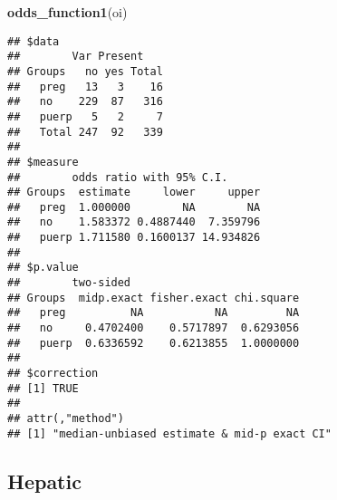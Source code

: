 \documentclass[
]{article}
\newenvironment{Shaded}{\begin{snugshade}}{\end{snugshade}}
\newcommand{\DataTypeTok}[1]{\textcolor[rgb]{0.13,0.29,0.53}{#1}}
\newcommand{\KeywordTok}[1]{\textcolor[rgb]{0.13,0.29,0.53}{\textbf{#1}}}
\newcommand{\NormalTok}[1]{#1}
\newcommand{\OperatorTok}[1]{\textcolor[rgb]{0.81,0.36,0.00}{\textbf{#1}}}
\newcommand{\OtherTok}[1]{\textcolor[rgb]{0.56,0.35,0.01}{#1}}
\newcommand{\StringTok}[1]{\textcolor[rgb]{0.31,0.60,0.02}{#1}}
\begin{document}
\begin{Shaded}
\begin{Highlighting}[]
\KeywordTok{odds_function1}\NormalTok{(oi)}
\end{Highlighting}
\end{Shaded}

\begin{verbatim}
## $data
##        Var Present
## Groups   no yes Total
##   preg   13   3    16
##   no    229  87   316
##   puerp   5   2     7
##   Total 247  92   339
## 
## $measure
##        odds ratio with 95% C.I.
## Groups  estimate     lower     upper
##   preg  1.000000        NA        NA
##   no    1.583372 0.4887440  7.359796
##   puerp 1.711580 0.1600137 14.934826
## 
## $p.value
##        two-sided
## Groups  midp.exact fisher.exact chi.square
##   preg          NA           NA         NA
##   no     0.4702400    0.5717897  0.6293056
##   puerp  0.6336592    0.6213855  1.0000000
## 
## $correction
## [1] TRUE
## 
## attr(,"method")
## [1] "median-unbiased estimate & mid-p exact CI"
\end{verbatim}

\hypertarget{hepatic}{%
\subsection{Hepatic}\label{hepatic}}

\begin{Shaded}
\end{Shaded}

\begin{Shaded}
\end{Shaded}
\end{document}
